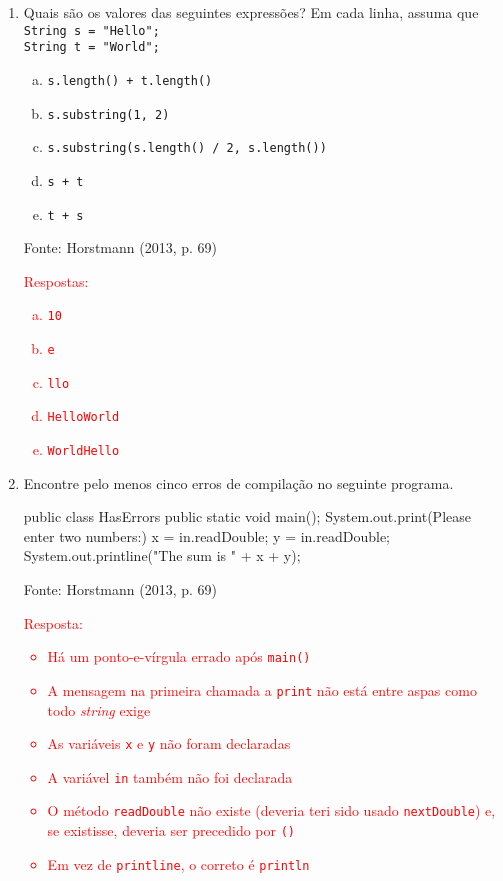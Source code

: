 \documentclass[onecolumn,a4paper,10pt]{report}
\newcommand{\+}{\, + \,}
\newcommand{\<}{\hspace*{-0.4cm}}
\begin{document}
\begin{enumerate}[1.]
\item Quais são os valores das seguintes expressões? Em cada linha, assuma que\\
\texttt{String s = "Hello";\\
String t = "World";}
\begin{enumerate}[a)]
\item \texttt{s.length() + t.length()}
\item \texttt{s.substring(1, 2)}
\item \texttt{s.substring(s.length() / 2, s.length())}
\item \texttt{s + t}
\item \texttt{t + s}
\end{enumerate}
{\tiny Fonte: Horstmann (2013, p. 69)}\\
\textcolor{red}{Respostas:
\begin{enumerate}[a)]
	\item \texttt{10}
	\item \texttt{e}
	\item \texttt{llo}
	\item \texttt{HelloWorld}
	\item \texttt{WorldHello}
\end{enumerate}
}

\item Encontre pelo menos cinco erros de compilação no seguinte programa.\\
\begin{javacode}
public class HasErrors
{
   public static void main();
   {
      System.out.print(Please enter two numbers:)
      x = in.readDouble;
      y = in.readDouble;
      System.out.printline("The sum is " + x + y);
   }
}
\end{javacode}
{\tiny Fonte: Horstmann (2013, p. 69)}\\
\textcolor{red}{Resposta:
\begin{itemize}
\item Há um ponto-e-vírgula errado após \texttt{main()}
\item A mensagem na primeira chamada a \texttt{print} não está entre aspas como todo \emph{string} exige
\item As variáveis \texttt{x} e \texttt{y} não foram declaradas
\item A variável \texttt{in} também não foi declarada
\item O método \texttt{readDouble} não existe (deveria teri sido usado \texttt{nextDouble}) e, se existisse, deveria ser precedido por \texttt{()}
\item Em vez de \texttt{printline}, o correto é \texttt{println}
\end{itemize}
}


\end{enumerate}
\end{document}
